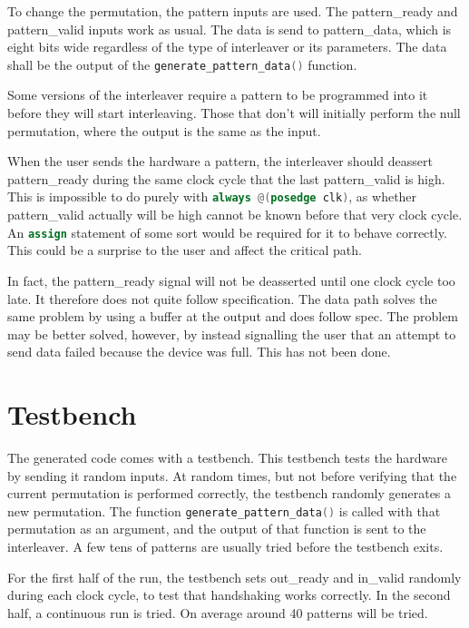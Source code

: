 \documentclass[
	utf8,
	largesmallcaps,
	intlimits,
	widermath,
	sharecounter,
	nobreak,
	definition=marks,
	numbers,
	noparts
]{rtthesis}
\begin{document}
To change the permutation, the pattern inputs are used. The pattern\_ready and
pattern\_valid inputs work as usual. The data is send to pattern\_data, which
is eight bits wide regardless of the type of interleaver or its parameters. The
data shall be the output of the \lstinline[language=C]{generate_pattern_data()}
function.

Some versions of the interleaver require a pattern to be programmed into it
before they will start interleaving. Those that don't will initially perform
the null permutation, where the output is the same as the input.

When the user sends the hardware a pattern, the interleaver should deassert
pattern\_ready during the same clock cycle that the last pattern\_valid is
high. This is impossible to do purely with
\lstinline[language=Verilog]{always @(posedge clk)},
as whether pattern\_valid actually will be high cannot be known before that
very clock cycle. An \lstinline[language=Verilog]{assign} statement of some
sort would be required for it to behave correctly. This could be a surprise to
the user and affect the critical path.

In fact, the pattern\_ready signal will not be deasserted until one clock cycle
too late. It therefore does not quite follow specification. The data path
solves the same problem by using a buffer at the output and does follow spec.
The problem may be better solved, however, by instead signalling the user that
an attempt to send data failed because the device was full. This has not been
done.

\section{Testbench}

The generated code comes with a testbench. This testbench tests the hardware by
sending it random inputs. At random times, but not before verifying that the
current permutation is performed correctly, the testbench randomly generates a
new permutation. The function \lstinline[language=C]{generate_pattern_data()}
is called with that permutation as an argument, and the output of that function
is sent to the interleaver. A few tens of patterns are usually tried before the
testbench exits.

For the first half of the run, the testbench sets out\_ready and in\_valid
randomly during each clock cycle, to test that handshaking works correctly. In
the second half, a continuous run is tried. On average around 40 patterns will
be tried.
\end{document}
